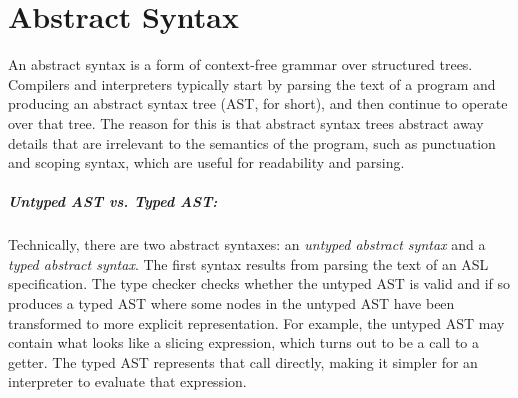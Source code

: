 \chapter{Abstract Syntax\label{chap:AbstractSyntax}}
An abstract syntax is a form of context-free grammar over structured trees.
Compilers and interpreters typically start by parsing the text of a program and producing an abstract syntax tree (AST, for short),
and then continue to operate over that tree.
%
The reason for this is that abstract syntax trees abstract away details that are irrelevant to the semantics of the program,
such as punctuation and scoping syntax, which are useful for readability and parsing.

\hypertarget{def-typedast}{}
\hypertarget{def-untypedast}{}
\paragraph{Untyped AST vs. Typed AST:}
Technically, there are two abstract syntaxes:
an \emph{untyped abstract syntax} and a \emph{typed abstract syntax}.
The first syntax results from parsing the text of an ASL specification.
The type checker checks whether the untyped AST is valid and if so produces
a typed AST where some nodes in the untyped AST have been transformed to
more explicit representation. For example, the untyped AST may contain
what looks like a slicing expression, which turns out to be a call to a getter.
The typed AST represents that call directly, making it simpler for an interpreter
to evaluate that expression.

